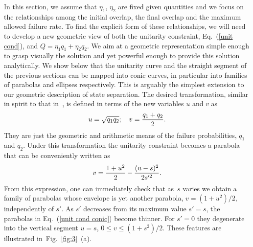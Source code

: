 \documentclass[aps,pra,twocolumn,showpacs]{revtex4-1}
\begin{document}
{In this section, we assume that $\eta_1$, $\eta_2$ are fixed given quantities and we focus on the relationships among the initial overlap, the final overlap and the maximum allowed failure rate. To find the explicit form of these relationships, we will need to develop a new geometric view of both the unitarity constraint, Eq.~(\ref{unit cond}), and $Q= \eta_1 q_1+\eta_2 q_2$. 
We aim at a geometric representation simple enough to grasp visually the solution and yet powerful enough to provide this solution analytically. We show below that the unitarity curve and the straight segment of the previous sections can be mapped into conic curves, in particular into families of parabolas and ellipses respectively. This is arguably the simplest extension to our geometric description of state separation. The desired transformation, similar in spirit to that in~\cite{Roa}, is defined in terms of the new variables $u$ and $v$ as
%
\begin{equation}
u=\sqrt{q_1 q_2};\quad v={q_1+q_2\over 2}.
\label{transf}
\end{equation}
%
They are just the geometric  and arithmetic means of the failure probabilities, $q_1$ and $q_2$. Under this transformation the unitarity constraint becomes a parabola that can be conveniently written as
%
\begin{equation}
v={1+u^2\over2}-{(u-s)^2\over2s'^2}.
\label{unit cond conic}
\end{equation}
%
From this expression, one can immediately check that as~$s$ varies we obtain a family of parabolas whose envelope is yet another parabola, $v=(1+u^2)/2$, independently of $s'$. As $s'$ decreases from its maximum value $s'=s$, the parabolas in Eq.~(\ref{unit cond conic}) become thinner. For $s'=0$ they degenerate into the vertical segment $u=s$, $0\le v\le (1+s^2)/2$. These features are illustrated in~Fig.~\ref{fig:3}~(a).

}
\end{document}
